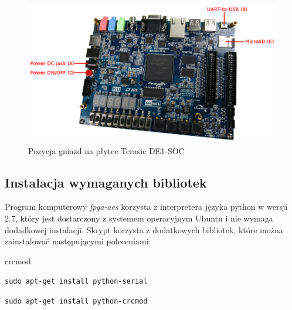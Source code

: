 \begin{figure}[!p]
\centering
\includegraphics[width=\textwidth]{pictures/fpga-board.jpg}
\caption{Pozycja gniazd na płytce Terasic DE1-SOC}
\label{fig:gniazda}
\end{figure}

\subsection{Instalacja wymaganych bibliotek}
Program komputerowy \textit{fpga-aes} korzysta z interpretera języka python w wersji 2.7, który jest dostarczony z systemem operacyjnym Ubuntu i nie wymaga dodadkowej instalacji. Skrypt korzysta z dodatkowych bibliotek, które można zainstalować następującymi poleceniami:
\begin{interface}{crcmod }
\item[\textbf{serial}] \verb|sudo apt-get install python-serial|
\item[\textbf{crcmod}] \verb|sudo apt-get install python-crcmod|
\end{interface}


